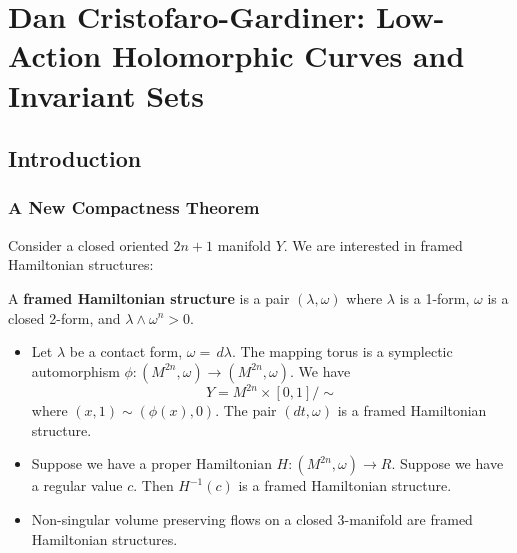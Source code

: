 \chapter{Dan Cristofaro-Gardiner: Low-Action Holomorphic Curves and Invariant Sets}
\label{cristofaro}


\section{Introduction}

\subsection{A New Compactness Theorem }

Consider a closed oriented $2n+1$ manifold $Y$. We are interested in framed Hamiltonian structures:

\begin{definition}

A \textbf{framed Hamiltonian structure} is a pair $(\lambda,\omega)$ where $\lambda$ is a 1-form, $\omega$ is a closed 2-form, and $\lambda \wedge \omega^n > 0$.

\end{definition}

\begin{example}
\text{ }
\begin{itemize}
\item Let $\lambda$ be a contact form, $\omega =\,d\lambda$. The mapping torus is a symplectic automorphism $\phi: (M^{2n}, \omega) \to (M^{2n}, \omega)$. We have
    \[
    Y=M^{2n}\times [0,1]/\sim
    \]
    where $(x,1) \sim (\phi(x), 0)$. The pair $(dt, \omega)$ is a framed Hamiltonian structure.
\item Suppose we have a proper Hamiltonian $H:(M^{2n}, \omega) \to R$. Suppose we have a regular value $c$. Then $H^{-1}(c)$ is a framed Hamiltonian structure.
\item Non-singular volume preserving flows on a closed 3-manifold are framed Hamiltonian structures.
\end{itemize}

\end{example}

